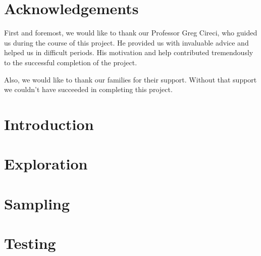 \documentclass[12pt]{report}
\author{Tilemachos Kosmetsas \& Christos Koutkos}
\date{December 2021}
\begin{document}



\chapter*{Acknowledgements}
First and foremost, we would like to thank our Professor Greg Cireci, who guided us during the course of this project. He provided us with invaluable advice and helped us in difficult periods. His motivation and help contributed tremendously to the successful completion of the project.

Also, we would like to thank our families for their support. Without that support we couldn’t have succeeded in completing this project.

\tableofcontents

\listoffigures

\listoftables

\chapter{Introduction}


\chapter{Exploration}


\chapter{Sampling}


\chapter{Testing}




\printbibliography
\end{document}

